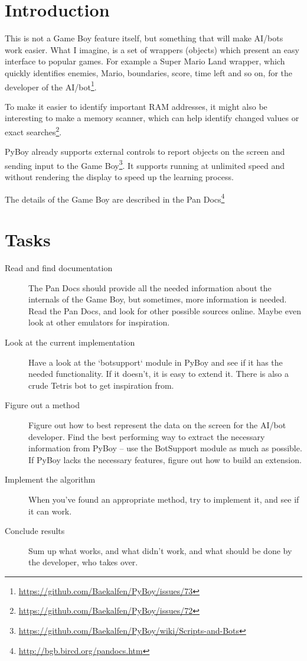\documentclass[11pt]{report} %
\begin{document}
\section*{Introduction}
This is not a Game Boy feature itself, but something that will make AI/bots work easier. What I imagine, is a set of wrappers (objects) which present an easy interface to popular games. For example a Super Mario Land wrapper, which quickly identifies enemies, Mario, boundaries, score, time left and so on, for the developer of the AI/bot\footnote{\url{https://github.com/Baekalfen/PyBoy/issues/73}}.

To make it easier to identify important RAM addresses, it might also be interesting to make a memory scanner, which can help identify changed values or exact searches\footnote{\url{https://github.com/Baekalfen/PyBoy/issues/72}}.

PyBoy already supports external controls to report objects on the screen and sending input to the Game Boy\footnote{\url{https://github.com/Baekalfen/PyBoy/wiki/Scripts-and-Bots}}. It supports running at unlimited speed and without rendering the display to speed up the learning process.

The details of the Game Boy are described in the Pan Docs\footnote{\url{http://bgb.bircd.org/pandocs.htm}}

\section*{Tasks}
\begin{description}
    \item [Read and find documentation]
        The Pan Docs should provide all the needed information about the internals of the Game Boy, but sometimes, more information is needed. Read the Pan Docs, and look for other possible sources online. Maybe even look at other emulators for inspiration.

    \item [Look at the current implementation]
        Have a look at the `botsupport` module in PyBoy and see if it has the needed functionality. If it doesn't, it is easy to extend it. There is also a crude Tetris bot to get inspiration from.

    \item [Figure out a method]
        Figure out how to best represent the data on the screen for the AI/bot developer. Find the best performing way to extract the necessary information from PyBoy -- use the BotSupport module as much as possible. If PyBoy lacks the necessary features, figure out how to build an extension.

    \item [Implement the algorithm]
        When you've found an appropriate method, try to implement it, and see if it can work.

    \item [Conclude results]
        Sum up what works, and what didn't work, and what should be done by the developer, who takes over.

\end{description}
\end{document}
